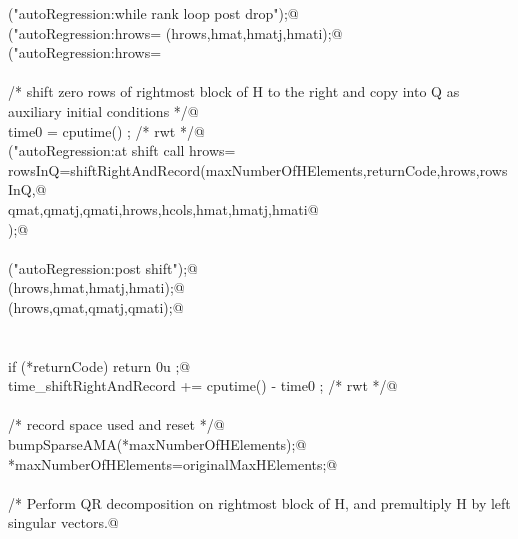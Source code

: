 \documentclass[12pt]{article}
\begin{document}
\begin{flushleft}
\begin{minipage}{\linewidth}
\begin{list}{}{}
\mbox{}\verb@printf("autoRegression:while rank loop post drop\n");@\\
\mbox{}\verb@printf("autoRegression:hrows=%u\n",hrows);fflush(stdout);@\\
\mbox{}\verb@cPrintSparse(hrows,hmat,hmatj,hmati);@\\
\mbox{}\verb@printf("autoRegression:hrows=%u\n",hrows);fflush(stdout);@\\
\mbox{}\verb@@\\
\mbox{}\verb@@\\
\mbox{}\verb@                /* shift zero rows of rightmost block of H to the right and copy into Q as auxiliary initial conditions */@\\
\mbox{}\verb@                time0 = cputime() ; /* rwt */@\\
\mbox{}\verb@printf("autoRegression:at shift call hrows=%u\n",hrows);fflush(stdout);@\\
\mbox{}\verb@                rowsInQ=shiftRightAndRecord(maxNumberOfHElements,returnCode,hrows,rowsInQ,@\\
\mbox{}\verb@                        qmat,qmatj,qmati,hrows,hcols,hmat,hmatj,hmati@\\
\mbox{}\verb@                );@\\
\mbox{}\verb@@\\
\mbox{}\verb@printf("autoRegression:post shift\n");@\\
\mbox{}\verb@cPrintSparse(hrows,hmat,hmatj,hmati);@\\
\mbox{}\verb@cPrintSparse(hrows,qmat,qmatj,qmati);@\\
\mbox{}\verb@@\\
\mbox{}\verb@@\\
\mbox{}\verb@                if (*returnCode) return 0u ;@\\
\mbox{}\verb@                time_shiftRightAndRecord += cputime() - time0 ; /* rwt */@\\
\mbox{}\verb@@\\
\mbox{}\verb@                /* record space used and reset */@\\
\mbox{}\verb@                bumpSparseAMA(*maxNumberOfHElements);@\\
\mbox{}\verb@                *maxNumberOfHElements=originalMaxHElements;@\\
\mbox{}\verb@@\\
\mbox{}\verb@                /* Perform QR decomposition on rightmost block of H, and premultiply H by left singular vectors.@\\

\end{list}
\end{minipage}
\end{flushleft}
\end{document}
